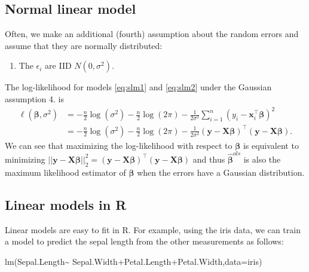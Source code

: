 \documentclass[
]{book}
\newenvironment{Shaded}{\begin{snugshade}}{\end{snugshade}}
\newcommand{\AttributeTok}[1]{\textcolor[rgb]{0.77,0.63,0.00}{#1}}
\newcommand{\FunctionTok}[1]{\textcolor[rgb]{0.00,0.00,0.00}{#1}}
\newcommand{\NormalTok}[1]{#1}
\newcommand{\SpecialCharTok}[1]{\textcolor[rgb]{0.00,0.00,0.00}{#1}}
\providecommand{\tightlist}{%
  \setlength{\itemsep}{0pt}\setlength{\parskip}{0pt}}
\theoremstyle{definition}
\theoremstyle{definition}
\theoremstyle{definition}
\theoremstyle{definition}
\theoremstyle{remark}
\begin{document}
\hypertarget{normal-linear-model}{%
\subsection{Normal linear model}\label{normal-linear-model}}

Often, we make an additional (fourth) assumption about the random errors and assume that they are normally distributed:

\begin{enumerate}
\def\labelenumi{\arabic{enumi}.}
\setcounter{enumi}{3}
\tightlist
\item
  The \(\epsilon_i\) are IID \(N(0, \sigma^2)\).
\end{enumerate}

The log-likelihood for models \eqref{eq:slm1} and \eqref{eq:slm2} under the Gaussian assumption 4. is
\begin{align*}
\ell(\boldsymbol \beta, \sigma^2)&=-\frac{n}{2}\log (\sigma^2)-\frac{n}{2}\log(2\pi)-\frac{1}{2\sigma^2} \sum_{i=1}^n (y_i-\mathbf x_i^\top \boldsymbol \beta)^2\\
& = -\frac{n}{2}\log (\sigma^2)-\frac{n}{2}\log(2\pi)-\frac{1}{2\sigma^2} (\mathbf y- \mathbf X\boldsymbol \beta)^\top (\mathbf y- \mathbf X\boldsymbol \beta).
\end{align*}
We can see that maximizing the log-likelihood with respect to \(\boldsymbol \beta\) is equivalent to minimizing \(||\mathbf y- \mathbf X\boldsymbol \beta||_2^2=(\mathbf y- \mathbf X\boldsymbol \beta)^\top (\mathbf y- \mathbf X\boldsymbol \beta)\)
and thus \(\hat{\boldsymbol \beta}^{ols}\) is also the maximum likelihood estimator of \(\boldsymbol \beta\) when the errors have a Gaussian distribution.

\hypertarget{linear-models-in-r}{%
\subsection{Linear models in R}\label{linear-models-in-r}}

Linear models are easy to fit in R. For example, using the iris data, we can train a model to predict the sepal length from the other measurements as follows:

\begin{Shaded}
\begin{Highlighting}[]
\FunctionTok{lm}\NormalTok{(Sepal.Length}\SpecialCharTok{\textasciitilde{}}\NormalTok{ Sepal.Width}\SpecialCharTok{+}\NormalTok{Petal.Length}\SpecialCharTok{+}\NormalTok{Petal.Width,}\AttributeTok{data=}\NormalTok{iris)}
\end{Highlighting}
\end{Shaded}
\end{document}
